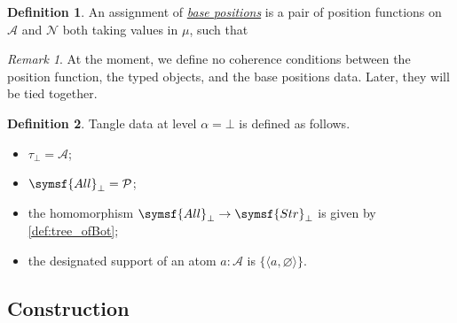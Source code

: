 \documentclass{article}
\newcommand{\cdef}[3]{\href{https://leanprover-community.github.io/con-nf/doc/ConNF/#1.html\#ConNF.#2}{\emph{#3}}}
\newcommand{\symmdiff}{\mathrel{\raisebox{1pt}{\( \mathsmaller\triangle \)}}}
\theoremstyle{definition}
\newtheorem{definition}{Definition}[section]
\theoremstyle{remark}
\newtheorem*{remark}{Remark}
\begin{document}
\begin{definition}
    An assignment of \cdef{Fuzz/Hypotheses}{BasePositions}{base positions} is a pair of position functions on \( \mathcal A \) and \( \mathcal N \) both taking values in \( \mu \), such that
\end{definition}
\begin{remark}
    At the moment, we define no coherence conditions between the position function, the typed objects, and the base positions data.
    Later, they will be tied together.
\end{remark}
\begin{definition}
    Tangle data at level \( \alpha = \bot \) is defined as follows.
    \begin{itemize}
        \item \( \tau_\bot = \mathcal A \);
        \item \( \symsf{All}_\bot = \mathcal P \);
        \item the homomorphism \( \symsf{All}_\bot \to \symsf{Str}_\bot \) is given by \cref{def:tree_ofBot};
        \item the designated support of an atom \( a : \mathcal A \) is \( \{\langle a, \varnothing \rangle\} \).
    \end{itemize}
\end{definition}

\subsection{Construction}
\end{document}
